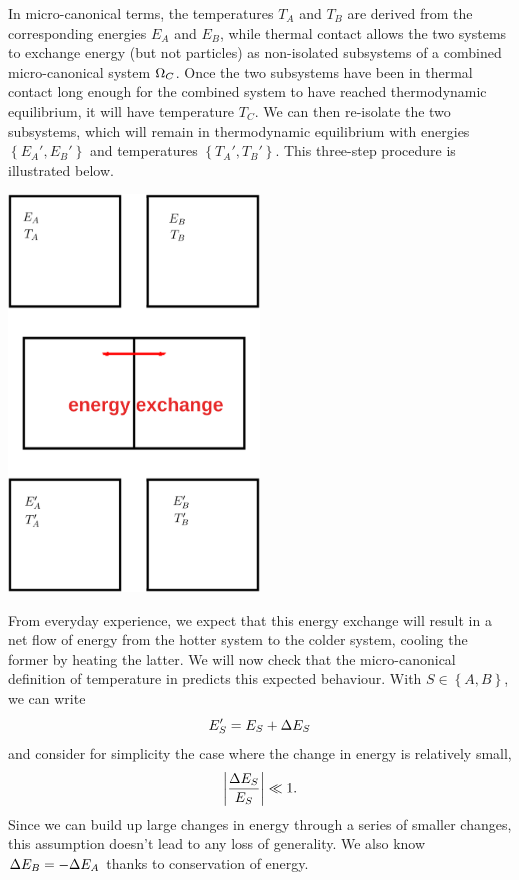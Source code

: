 In micro-canonical terms, the temperatures $T_A$ and $T_B$ are derived from the corresponding energies $E_A$ and $E_B$, while thermal contact allows the two systems to exchange energy (but not particles) as non-isolated subsystems of a combined micro-canonical system $\Omega_C$.
Once the two subsystems have been in thermal contact long enough for the combined system to have reached thermodynamic equilibrium, it will have temperature $T_C$.
We can then re-isolate the two subsystems, which will remain in thermodynamic equilibrium with energies $\left\{E_A', E_B'\right\}$ and temperatures $\left\{T_A', T_B'\right\}$.
This three-step procedure is illustrated below.

\begin{center}
  \includegraphics[width=0.5\textwidth]{figs/unit02_heat-exchange.pdf}
\end{center}

From everyday experience, we expect that this energy exchange will result in a net flow of energy from the hotter system to the colder system, cooling the former by heating the latter.
We will now check that the micro-canonical definition of temperature in  predicts this expected behaviour.
With $S \in \left\{A, B\right\}$, we can write
\begin{equation*}
  E_S' = E_S + \Delta E_S
\end{equation*}
and consider for simplicity the case where the change in energy is relatively small,
\begin{equation*}
  \left|\frac{\Delta E_S}{E_S}\right| \ll 1.
\end{equation*}
Since we can build up large changes in energy through a series of smaller changes, this assumption doesn't lead to any loss of generality.
We also know $\Delta E_B = -\Delta E_A$ thanks to conservation of energy.

